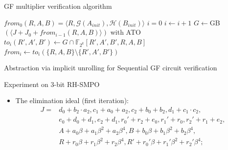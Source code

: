 \documentclass[xcolor=dvipsnames]{beamer}
\newcommand{\bi}{\begin{itemize}}
\newcommand{\ei}{\end{itemize}}
\begin{document}
\begin{frame}{\large{GF multiplier verification algorithm}}
\begin{algorithm}[H] %
\SetAlgoNoLine

  $from_0(R,A,B) = \langle R, \mathcal{G}(A_{init}), \mathcal{H}(B_{init})\rangle$\;
  $i = 0$\;
  {
  	$i \gets i + 1$\;
	\alert{$G \gets$GB$( \langle J + J_0+ from_{i-1}(R,A,B) \rangle)$ with ATO}\;
	$to_i(R',A',B')\gets G\cap \mathbb F_{2^k}[R',A',B',R,A,B]$\;
	$from_i \gets to_i(\{R,A,B\}\setminus \{R',A',B'\})$\;
  }
\caption {Abstraction via implicit unrolling for Sequential GF circuit verification}
\end{algorithm}
\end{frame}
\begin{frame}{\large{Experiment on 3-bit RH-SMPO}}
\begin{figure}[hbt]
\end{figure}
\vspace{-0.2in}
\bi
\item The elimination ideal (first iteration):
\begin{align*}
J = &d_0+b_2\cdot a_2,
c_1+a_0+a_2,
c_2+b_0+b_2,
d_1+c_1\cdot c_2,\\
&e_0+d_0+d_1,
e_2+d_1,
r_0'+r_2+e_0,
r_1'+r_0,
r_2'+r_1+e_2,\\
&A+a_0\beta+a_1\beta^2+a_2\beta^4,
B+b_0\beta+b_1\beta^2+b_2\beta^4,\\
&R+r_0\beta+r_1\beta^2+r_2\beta^4,
R'+r_0'\beta+r_1'\beta^2+r_2'\beta^4;
\end{align*}
\ei
\end{frame}
\end{document}
